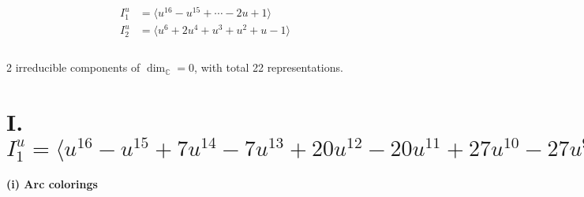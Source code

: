 \documentclass[1p]{elsarticle_modified}
\theoremstyle{definition}
\begin{document}
\begin{align*}
I^u_{1}&=\langle 
u^{16}- u^{15}+\cdots-2 u+1\rangle \\
I^u_{2}&=\langle 
u^6+2 u^4+u^3+u^2+u-1\rangle \\
\\
\end{align*}
\raggedright * 2 irreducible components of $\dim_{\mathbb{C}}=0$, with total 22 representations.\\
\newpage
\renewcommand{\arraystretch}{1}
\centering \section*{I. $I^u_{1}= \langle u^{16}- u^{15}+7 u^{14}-7 u^{13}+20 u^{12}-20 u^{11}+27 u^{10}-27 u^9+12 u^8-12 u^7-8 u^6+8 u^5-6 u^4+6 u^3+3 u^2-2 u+1 \rangle$}
\flushleft \textbf{(i) Arc colorings}\\
\end{document}
